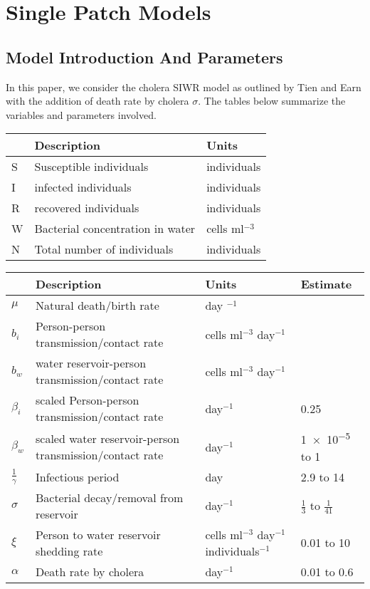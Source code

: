 \documentclass[12pt]{article}\usepackage[]{graphicx}\usepackage[]{color}
\begin{document}
\section{Single Patch Models}
\subsection{Model Introduction And Parameters}

In this paper, we consider the cholera SIWR model as outlined by Tien and Earn \cite{link9} with the addition of death rate by cholera $\sigma$.  The tables below
summarize the variables and parameters involved.

\begin{center}
	\begin{tabular}{ | m{1em} | m{8.14cm}| m{5.5cm} | }
		\hline
		\textbf{ }& \textbf{Description} & \textbf{Units} \\
		\hline
		S & Susceptible individuals & individuals \\
		\hline
		I & infected individuals & individuals \\
		\hline
		R & recovered individuals & individuals \\
		\hline
		W & Bacterial concentration in water & cells ml$^{-3}$ \\
		\hline
		N & Total number of individuals & individuals\\
		\hline
	\end{tabular}
\end{center}

\begin{center}
	\begin{tabular}{ | m{1em} | m{8cm}| m{3cm} | m{2.2cm} | }
		\hline
		\textbf{ }& \textbf{Description} & \textbf{Units} &  \textbf{Estimate} \\
		\hline
		$\mu$ & Natural death/birth rate & day $^{-1}$ & \\
		\hline
		$b_i$ &  Person-person transmission/contact rate & cells ml$^{-3}$ day$^{-1}$ & \\
		\hline
		$b_w$ & water reservoir-person transmission/contact rate & cells ml$^{-3}$ day$^{-1}$&  \\
		\hline
		$\beta_i$ & scaled Person-person transmission/contact rate & day$^{-1}$ & 0.25\\
		\hline
		$\beta_w$ & scaled water reservoir-person transmission/contact rate & day$^{-1}$& \num{1e-5} to 1 \\
		\hline
		$\frac{1}{\gamma}$ & Infectious period & day& 2.9 to 14\\
		\hline
		$\sigma$ & Bacterial decay/removal from reservoir & day$^{-1}$& $\frac{1}{3}$ to $\frac{1}{41}$ \\
		\hline
		$\xi$ & Person to water reservoir shedding rate  & cells ml$^{-3}$ day$^{-1}$ individuals$^{-1}$ & 0.01 to 10\\
		\hline
		$\alpha$ & Death rate by cholera & day$^{-1}$& 0.01 to 0.6 \\
		\hline
	\end{tabular}
\end{center}
\end{document}
